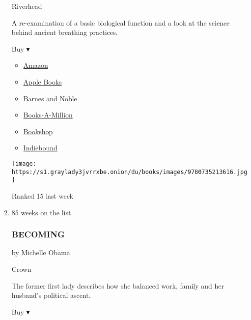 \begin{enumerate}
  Riverhead

  A re-examination of a basic biological function and a look at the
  science behind ancient breathing practices.

  Buy ▾

  \begin{itemize}
  \tightlist
  \item
    \href{https://www.amazon.com/dp/0735213615?tag=NYTBSREV-20\&tag=NYTBS-20}{Amazon}
  \item
    \href{https://du-gae-books-dot-nyt-du-prd.appspot.com/buy?title=BREATH\&author=James+Nestor}{Apple
    Books}
  \item
    \href{https://www.anrdoezrs.net/click-7990613-11819508?url=https\%3A\%2F\%2Fwww.barnesandnoble.com\%2Fw\%2F\%3Fean\%3D9780735213616}{Barnes
    and Noble}
  \item
    \href{https://www.anrdoezrs.net/click-7990613-35140?url=https\%3A\%2F\%2Fwww.booksamillion.com\%2Fp\%2FBREATH\%2FJames\%2BNestor\%2F9780735213616}{Books-A-Million}
  \item
    \href{https://bookshop.org/a/3546/9780735213616}{Bookshop}
  \item
    \href{https://www.indiebound.org/book/9780735213616?aff=NYT}{Indiebound}
  \end{itemize}

  \texttt{[image: https://s1.graylady3jvrrxbe.onion/du/books/images/9780735213616.jpg]}

  Ranked 15 last week
\item
  \href{https://www.nytimes3xbfgragh.onion/2018/12/06/books/review/michelle-obama-becoming-memoir.html}{}

  85 weeks on the list

  \hypertarget{becoming}{%
  \subsubsection{BECOMING}\label{becoming}}

  by Michelle Obama

  Crown

  The former first lady describes how she balanced work, family and her
  husband's political ascent.

  Buy ▾


\end{enumerate}
